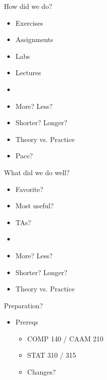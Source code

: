 \documentclass[aspectratio=169]{beamer}
\begin{document}
\begin{frame}{How did we do?}

\begin{itemize}
\item Exercises
\item Assignments
\item Labs
\item Lectures
\item[]
\item More? Less?
\item Shorter? Longer?
\item Theory vs. Practice
\item Pace?
\end{itemize}
\end{frame}

\begin{frame}{What did we do well?}

\begin{itemize}
\item Favorite?
\item Most useful?
\item TAs?
\item[]
\item More? Less?
\item Shorter? Longer?
\item Theory vs. Practice
\end{itemize}
\end{frame}

\begin{frame}{Preparation?}

\begin{itemize}
\item Prereqs
\begin{itemize}
\item COMP 140 / CAAM 210
\item STAT 310 / 315 
\item Changes?

\end{itemize}

\end{itemize}
\end{frame}
\end{document}
